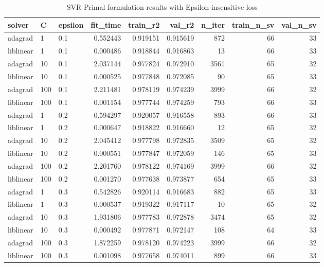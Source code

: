 \begin{table}[h!]
\centering
\caption{SVR Primal formulation results with Epsilon-insensitive loss}
\label{primal_svr_eps_cv_results}
\begin{tabular}{lllrrrrrr}
\toprule
   solver &   C & epsilon &  fit\_time &  train\_r2 &   val\_r2 &  n\_iter &  train\_n\_sv &  val\_n\_sv \\
\midrule
  adagrad &   1 &     0.1 &  0.552443 &  0.919151 & 0.915619 &     872 &          66 &        33 \\
liblinear &   1 &     0.1 &  0.000486 &  0.918844 & 0.916863 &      13 &          66 &        33 \\
  adagrad &  10 &     0.1 &  2.037144 &  0.977824 & 0.972910 &    3561 &          65 &        32 \\
liblinear &  10 &     0.1 &  0.000525 &  0.977848 & 0.972085 &      90 &          65 &        33 \\
  adagrad & 100 &     0.1 &  2.211481 &  0.978119 & 0.974239 &    3999 &          66 &        32 \\
liblinear & 100 &     0.1 &  0.001154 &  0.977744 & 0.974259 &     793 &          66 &        33 \\
  adagrad &   1 &     0.2 &  0.594297 &  0.920057 & 0.916558 &     893 &          66 &        33 \\
liblinear &   1 &     0.2 &  0.000647 &  0.918822 & 0.916660 &      12 &          65 &        32 \\
  adagrad &  10 &     0.2 &  2.045412 &  0.977798 & 0.972835 &    3509 &          65 &        32 \\
liblinear &  10 &     0.2 &  0.000551 &  0.977847 & 0.972059 &     146 &          65 &        33 \\
  adagrad & 100 &     0.2 &  2.201760 &  0.978122 & 0.974169 &    3999 &          66 &        32 \\
liblinear & 100 &     0.2 &  0.001270 &  0.977638 & 0.973877 &     654 &          65 &        33 \\
  adagrad &   1 &     0.3 &  0.542826 &  0.920114 & 0.916683 &     882 &          65 &        33 \\
liblinear &   1 &     0.3 &  0.000537 &  0.919322 & 0.917117 &      10 &          65 &        32 \\
  adagrad &  10 &     0.3 &  1.931806 &  0.977783 & 0.972878 &    3474 &          65 &        32 \\
liblinear &  10 &     0.3 &  0.000492 &  0.977871 & 0.972147 &     108 &          64 &        33 \\
  adagrad & 100 &     0.3 &  1.872259 &  0.978120 & 0.974223 &    3999 &          66 &        32 \\
liblinear & 100 &     0.3 &  0.001098 &  0.977658 & 0.974011 &     899 &          66 &        33 \\
\bottomrule
\end{tabular}
\end{table}
